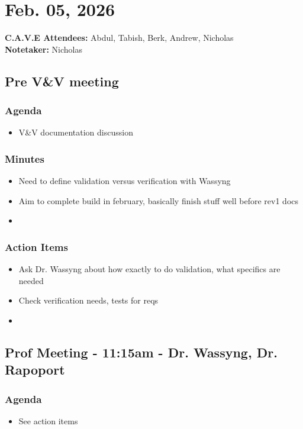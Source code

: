 	\pagebreak
	\section*{Feb. 05, 2026}

	\textbf{C.A.V.E Attendees:} Abdul, Tabish, Berk, Andrew, Nicholas\\
	\textbf{Notetaker:} Nicholas

	\subsection*{Pre V\&V meeting}
		\subsubsection*{Agenda}
			\begin{itemize}
				\item V\&V documentation discussion
			\end{itemize}

		\subsubsection*{Minutes}
			\begin{itemize}
				\item Need to define validation versus verification with Wassyng
				\item Aim to complete build in february, basically finish stuff well before rev1 docs
				\item 
			\end{itemize}

		\subsubsection*{Action Items}
			\begin{itemize}
				\item Ask Dr. Wassyng about how exactly to do validation, what specifics are needed
				\item Check verification needs, tests for reqs
				\item 
			\end{itemize}

	\subsection*{Prof Meeting - 11:15am - Dr. Wassyng, Dr. Rapoport}
		\subsubsection*{Agenda}
			\begin{itemize}
				\item See action items
			\end{itemize}

